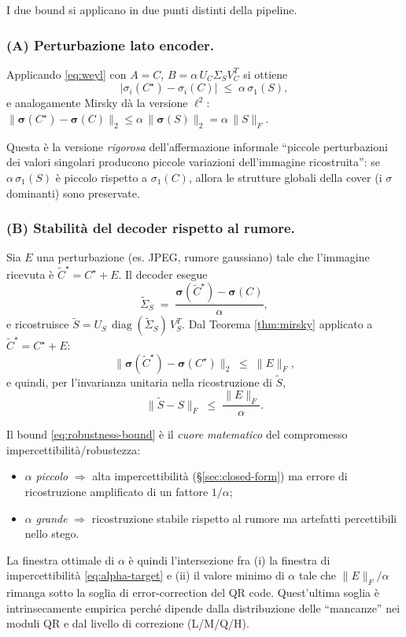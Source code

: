 \documentclass[11pt,a4paper]{article}
\theoremstyle{definition}
\theoremstyle{remark}
\DeclareMathOperator{\diag}{diag}
\begin{document}
I due bound si applicano in due punti distinti della pipeline.

\subsubsection*{(A) Perturbazione lato encoder.}
Applicando \eqref{eq:weyl} con $A=C$, $B = \alpha\,U_C\Sigma_S V_C^T$
si ottiene
\begin{equation}\label{eq:weyl-encoder}
  \bigl|\sigma_i(C^{\star}) - \sigma_i(C)\bigr|
  \;\leq\; \alpha\,\sigma_1(S),
\end{equation}
e analogamente Mirsky dà la versione $\ell^2$:
$\|\boldsymbol{\sigma}(C^{\star}) - \boldsymbol{\sigma}(C)\|_2 \leq
\alpha\,\|\boldsymbol\sigma(S)\|_2 = \alpha\,\|S\|_F$.

\noindent
Questa è la versione \emph{rigorosa} dell'affermazione informale
``piccole perturbazioni dei valori singolari producono piccole
variazioni dell'immagine ricostruita'': se $\alpha\,\sigma_1(S)$ è
piccolo rispetto a $\sigma_1(C)$, allora le strutture globali della
cover (i $\sigma$ dominanti) sono preservate.

\subsubsection*{(B) Stabilità del decoder rispetto al rumore.}
Sia $E$ una perturbazione (es. JPEG, rumore gaussiano) tale che
l'immagine ricevuta è $\widetilde C^{\star} = C^{\star} + E$.  Il
decoder esegue
\[
  \widetilde\Sigma_S
  \;=\;
  \frac{\boldsymbol\sigma(\widetilde C^{\star}) - \boldsymbol\sigma(C)}{\alpha},
\]
e ricostruisce
$\widetilde S = U_S\,\diag(\widetilde\Sigma_S)\,V_S^T$.
Dal Teorema \ref{thm:mirsky} applicato a $\widetilde C^{\star}
= C^{\star} + E$:
\[
  \|\boldsymbol\sigma(\widetilde C^{\star}) - \boldsymbol\sigma(C^{\star})\|_2
  \;\leq\; \|E\|_F,
\]
e quindi, per l'invarianza unitaria nella ricostruzione di
$\widetilde S$,
\begin{equation}\label{eq:robustness-bound}
  \boxed{
  \|\widetilde S - S\|_F
  \;\leq\; \frac{\|E\|_F}{\alpha}.
  }
\end{equation}

Il bound \eqref{eq:robustness-bound} è il \emph{cuore matematico} del
compromesso impercettibilità/robustezza:
\begin{itemize}[leftmargin=*,itemsep=2pt]
  \item $\alpha$ \emph{piccolo} $\Longrightarrow$ alta impercettibilità
        (\S\ref{sec:closed-form}) ma errore di ricostruzione
        amplificato di un fattore $1/\alpha$;
  \item $\alpha$ \emph{grande} $\Longrightarrow$ ricostruzione stabile
        rispetto al rumore ma artefatti percettibili nello stego.
\end{itemize}
La finestra ottimale di $\alpha$ è quindi l'intersezione fra (i) la
finestra di impercettibilità \eqref{eq:alpha-target} e (ii) il valore
minimo di $\alpha$ tale che $\|E\|_F/\alpha$ rimanga sotto la
soglia di error-correction del QR code.  Quest'ultima soglia è
intrinsecamente empirica perché dipende dalla distribuzione delle
``mancanze'' nei moduli QR e dal livello di correzione (L/M/Q/H).
\end{document}

